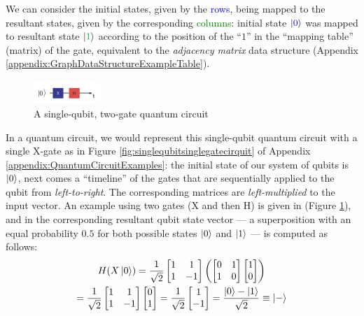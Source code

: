 \documentclass[conference]{IEEEtran}
\begin{document}
We can consider the initial states, given by the \textcolor{blue}{rows}, being mapped to the resultant states, given
by the corresponding \textcolor{Green}{columns}: initial state $\ket{\textcolor{blue}{0}}$ was
mapped to resultant state $\ket{\textcolor{Green}{1}}$ according to the position of the ``$1$'' in the
``mapping table'' (matrix) of the gate, equivalent to the \textit{adjacency matrix} data structure (Appendix \ref{appendix:GraphDataStructureExampleTable}).

\begin{figure}[tbp]
    \centerline{
        \includegraphics[width=0.225\textwidth]{img/x-h-circuit.png}
    }
    \caption{A single-qubit, two-gate quantum circuit}
    \label{fig:singlequbittwogatecirquit}
\end{figure}

In a quantum circuit, we would represent this single-qubit quantum circuit with a single X-gate as in
Figure \ref{fig:singlequbitsinglegatecirquit} of Appendix \ref{appendix:QuantumCircuitExamples}:
the initial state of our system of qubits is $\ket{0}$, next comes a ``timeline''
of the gates that are sequentially applied to the qubit from \textit{left-to-right}.
The corresponding matrices are \textit{left-multiplied} to the input vector.
An example using two gates (X and then H) is given in (Figure \ref{fig:singlequbittwogatecirquit}),
and in the corresponding resultant qubit state vector — a superposition with an equal
probability $0.5$ for both possible states $\ket{0}$ and $\ket{1}$ — is computed as follows:
\begin{multline*}
    H(X\ket{0})
    =
    \frac{1}{\sqrt{2}}
    \begin{bmatrix}
        1 & 1 \\
        1 & -1
    \end{bmatrix}
    \left(
    \begin{bmatrix}
        0 & 1 \\
        1 & 0
    \end{bmatrix}
    \begin{bmatrix}
        1 \\
        0
    \end{bmatrix}
    \right) \\
    =
    \frac{1}{\sqrt{2}}
    \begin{bmatrix}
        1 & 1 \\
        1 & -1
    \end{bmatrix}
    \begin{bmatrix}
        0 \\
        1
    \end{bmatrix}
    =
    \frac{1}{\sqrt{2}}
    \begin{bmatrix}
        1 \\
        -1
    \end{bmatrix}
    =
    \frac{\ket{0}-\ket{1}}{\sqrt{2}}
    \equiv
    \ket{-}
\end{multline*}
\end{document}
